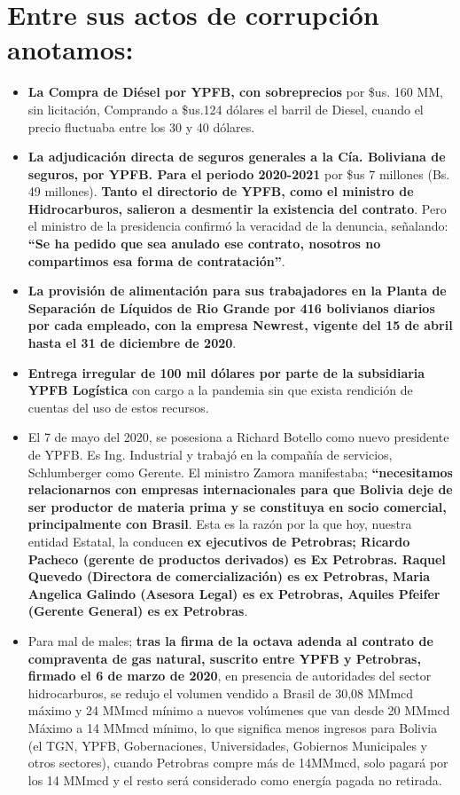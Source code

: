 \documentclass[a4paper, nobind]{templates/ociamthesis}
\begin{document}
\hypertarget{entre-sus-actos-de-corrupciuxf3n-anotamos}{%
\section{Entre sus actos de corrupción anotamos:}\label{entre-sus-actos-de-corrupciuxf3n-anotamos}}

\begin{itemize}
\item
  \textbf{La Compra de Diésel por YPFB, con sobreprecios} por \$us. 160 MM, sin licitación, Comprando a \$us.124 dólares el barril de Diesel, cuando el precio fluctuaba entre los 30 y 40 dólares.
\item
  \textbf{La adjudicación directa de seguros generales a la Cía. Boliviana de seguros, por YPFB. Para el periodo 2020-2021} por \$us 7 millones (Bs. 49 millones). \textbf{Tanto el directorio de YPFB, como el ministro de Hidrocarburos, salieron a desmentir la existencia del contrato}. Pero el ministro de la presidencia confirmó la veracidad de la denuncia, señalando: \textbf{``Se ha pedido que sea anulado ese contrato, nosotros no compartimos esa forma de contratación''}.
\item
  \textbf{La provisión de alimentación para sus trabajadores en la Planta de Separación de Líquidos de Rio Grande por 416 bolivianos diarios por cada empleado, con la empresa Newrest, vigente del 15 de abril hasta el 31 de diciembre de 2020}.
\item
  \textbf{Entrega irregular de 100 mil dólares por parte de la subsidiaria YPFB Logística} con cargo a la pandemia sin que exista rendición de cuentas del uso de estos recursos.
\item
  El 7 de mayo del 2020, se posesiona a Richard Botello como nuevo presidente de YPFB. Es Ing. Industrial y trabajó en la compañía de servicios, Schlumberger como Gerente. El ministro Zamora manifestaba; \textbf{``necesitamos relacionarnos con empresas internacionales para que Bolivia deje de ser productor de materia prima y se constituya en socio comercial, principalmente con Brasil}. Esta es la razón por la que hoy, nuestra entidad Estatal, la conducen \textbf{ex ejecutivos de Petrobras; Ricardo Pacheco (gerente de productos derivados) es Ex Petrobras. Raquel Quevedo (Directora de comercialización) es ex Petrobras, Maria Angelica Galindo (Asesora Legal) es ex Petrobras, Aquiles Pfeifer (Gerente General) es ex Petrobras}.
\item
  Para mal de males; \textbf{tras la firma de la octava adenda al contrato de compraventa de gas natural, suscrito entre YPFB y Petrobras, firmado el 6 de marzo de 2020}, en presencia de autoridades del sector hidrocarburos, se redujo el volumen vendido a Brasil de 30,08 MMmcd máximo y 24 MMmcd mínimo a nuevos volúmenes que van desde 20 MMmcd Máximo a 14 MMmcd mínimo, lo que significa menos ingresos para Bolivia (el TGN, YPFB, Gobernaciones, Universidades, Gobiernos Municipales y otros sectores), cuando Petrobras compre más de 14MMmcd, solo pagará por los 14 MMmcd y el resto será considerado como energía pagada no retirada.
\end{itemize}
\end{document}
